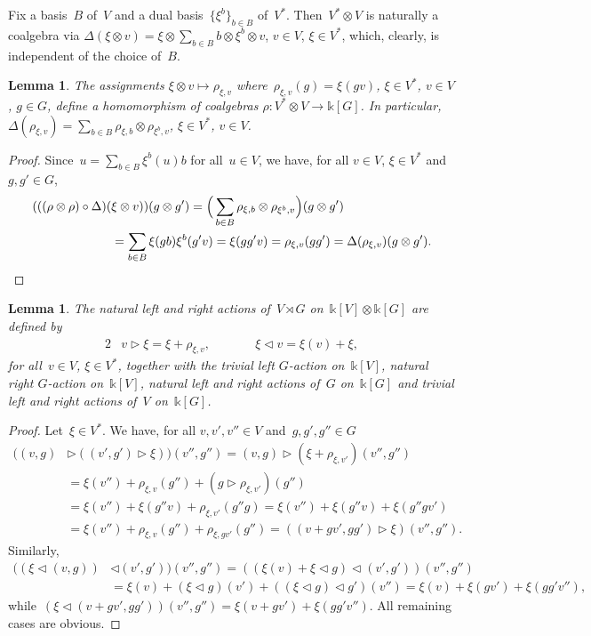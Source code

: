 \documentclass[12pt, reqno]{amsart}
\newcommand{\lact}{\triangleright}
\newtheorem{lemma}[theorem]{Lemma}
\theoremstyle{definition}
\numberwithin{equation}{section}
\newcommand{\tensor}{\otimes}
\newcommand{\kk}{\mathbb{k}}\newcommand{\lie}[1]{{\mathfrak{#1}}}
\begin{document}
Fix a basis~$B$ of~$V$
and a dual basis~$\{\xi^b\}_{b\in B}$ of~$V^*$. Then~$V^*\tensor V$ is naturally a 
coalgebra via $\Delta(\xi\tensor v)=\xi\tensor \sum_{b\in B} b\tensor \xi^b\tensor v$, $v\in V$, $\xi\in V^*$, which, clearly,
is independent of the choice of~$B$.
\begin{lemma}\label{lem:hom-coalg}
The assignments $\xi\tensor v\mapsto \rho_{\xi,v}$ where~$\rho_{\xi,v}(g)=\xi(gv)$, $\xi\in V^*$, $v\in V$, $g\in G$, define a homomorphism
of coalgebras $\rho:V^*\tensor V\to \kk[G]$. In particular,
$\Delta(\rho_{\xi,v})=\sum_{b\in B} \rho_{\xi,b}\tensor \rho_{\xi^b,v}$, $\xi\in V^*$,
$v\in V$.
\end{lemma}
\begin{proof}
Since~$u=\sum_{b\in B}\xi^b(u)b$ for all~$u\in V$,
we have, for all $v\in V$, $\xi\in V^*$ and~$g,g'\in G$,
\begin{align*}
(((\rho\tensor\rho)\circ\Delta)(&\xi\tensor v))(g\tensor g')=
\Big(\sum_{b\in B} \rho_{\xi,b}\tensor \rho_{\xi^b,v}\Big)(g\tensor g')\\
&=\sum_{b\in B} \xi(g b)\xi^b(g'v)=\xi(gg'v)=\rho_{\xi,v}(gg')
=\Delta(\rho_{\xi,v})(g\tensor g').\qedhere
\end{align*}
\end{proof}
\begin{lemma}
The natural left and right actions of~$V\rtimes G$
on~$\kk[V]\tensor \kk[G]$ are defined by
\begin{alignat*}{2}
&v\triangleright \xi=\xi+\rho_{\xi,v},&\qquad &
\xi\triangleleft v=\xi(v)+\xi,\end{alignat*}
for all~$v\in V$, $\xi\in V^*$, together
with the trivial left $G$-action on~$\kk[V]$,
natural right $G$-action on~$\kk[V]$,
natural left and right actions of~$G$ on~$\kk[G]$
and trivial left and right actions of~$V$ on~$\kk[G]$.
\end{lemma}
\begin{proof}
Let~$\xi\in V^*$. We have, for all $v,v',v''\in V$
and~$g,g',g''\in G$
\begin{align*}
((v,g)&\lact ((v',g')\lact \xi))(v'',g'')=
(v,g)\lact (\xi+\rho_{\xi,v'})(v'',g'')\\&
=\xi(v'')+\rho_{\xi,v}(g'')+(g\lact \rho_{\xi,v'})(g'')
\\
&=\xi(v'')+\xi(g''v)+\rho_{\xi,v'}(g''g)=\xi(v'')+\xi(g''v)+\xi(g''gv')\\
&=\xi(v'')+\rho_{\xi,v}(g'')+\rho_{\xi,gv'}(g'')
=((v+gv',gg')\lact \xi)(v'',g'').
\end{align*}
Similarly,
\begin{align*}
((\xi\triangleleft (v,g))&\triangleleft (v',g'))(v'',g'')
=((\xi(v)+\xi\triangleleft g)\triangleleft (v',g'))(v'',g'')
\\
&=\xi(v)+(\xi\triangleleft g)(v')+((\xi\triangleleft g)\triangleleft g')(v'')=
\xi(v)+\xi(gv')+\xi(gg'v''),
\end{align*}
while~$
(\xi\triangleleft (v+gv',gg'))(v'',g'')
=\xi(v+gv')+\xi(gg'v'')$.
All remaining cases are obvious.
\end{proof}
\end{document}
